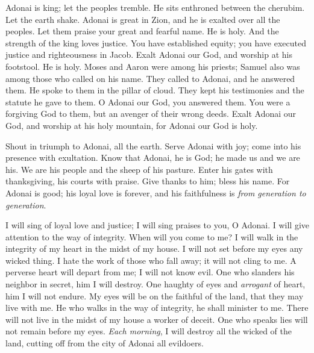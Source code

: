 \begin{biblechapter} %
 Adonai is king; let the peoples tremble. 
He sits enthroned between the cherubim. Let the earth shake.
\verse Adonai is great in Zion, 
and he is exalted over all the peoples.
\verse Let them praise your great and fearful name. 
He is holy.
\verse And the strength of the king loves justice. 
You have established equity; 
you have executed justice and righteousness in Jacob.
\verse Exalt Adonai our God, 
and worship at his footstool. 
He is holy.
\verse Moses and Aaron were among his priests; 
Samuel also was among those who called on his name. 
They called to Adonai, and he answered them.
\verse He spoke to them in the pillar of cloud. 
They kept his testimonies and the statute he gave to them.
\verse O Adonai our God, you answered them. 
You were a forgiving God to them, 
but an avenger of their wrong deeds.
\verse Exalt Adonai our God, 
and worship at his holy mountain, 
for Adonai our God is holy.
\end{biblechapter}

\begin{biblechapter} %
 Shout in triumph to Adonai, all the earth.
\verse Serve Adonai with joy; 
come into his presence with exultation.
\verse Know that Adonai, he is God; 
he made us and we are his. 
We are his people and the sheep of his pasture.
\verse Enter his gates with thanksgiving, 
his courts with praise. 
Give thanks to him; bless his name.
\verse For Adonai is good; his loyal love is forever, 
and his faithfulness is \textit{from generation to generation}.
\end{biblechapter}

\begin{biblechapter} %
 I will sing of loyal love and justice; 
I will sing praises to you, O Adonai.
\verse I will give attention to the way of integrity. 
When will you come to me? 
I will walk in the integrity of my heart 
in the midst of my house.
\verse I will not set before my eyes 
any wicked thing. 
I hate the work of those who fall away; 
it will not cling to me.
\verse A perverse heart will depart from me; 
I will not know evil.
\verse One who slanders his neighbor in secret, 
him I will destroy. 
One haughty of eyes and \textit{arrogant} of heart, 
him I will not endure.
\verse My eyes will be on the faithful of the land, 
that they may live with me. 
He who walks in the way of integrity, 
he shall minister to me.
\verse There will not live in the midst of my house 
a worker of deceit. 
One who speaks lies 
will not remain before my eyes.
\verse \textit{Each morning}, 
I will destroy all the wicked of the land, 
cutting off from the city of Adonai all evildoers.
\end{biblechapter}

